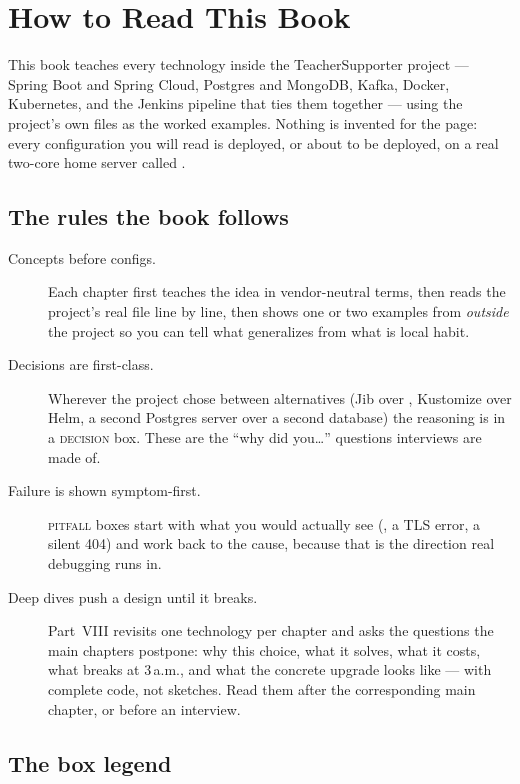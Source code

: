 \chapter{How to Read This Book}

This book teaches every technology inside the TeacherSupporter project ---
Spring Boot and Spring Cloud, Postgres and MongoDB, Kafka, Docker,
Kubernetes, and the Jenkins pipeline that ties them together --- using the
project's own files as the worked examples. Nothing is invented for the
page: every configuration you will read is deployed, or about to be
deployed, on a real two-core home server called .

\section*{The rules the book follows}

\begin{description}
  \item[Concepts before configs.] Each chapter first teaches the idea in
  vendor-neutral terms, then reads the project's real file line by line,
  then shows one or two examples from \emph{outside} the project so you can
  tell what generalizes from what is local habit.
  \item[Decisions are first-class.] Wherever the project chose between
  alternatives (Jib over , Kustomize over Helm, a second
  Postgres server over a second database) the reasoning is in a
  \textsc{decision} box. These are the ``why did you\ldots'' questions
  interviews are made of.
  \item[Failure is shown symptom-first.] \textsc{pitfall} boxes start with
  what you would actually see (, a TLS error, a
  silent 404) and work back to the cause, because that is the direction
  real debugging runs in.
  \item[Deep dives push a design until it breaks.] Part~VIII revisits
  one technology per chapter and asks the questions the main chapters
  postpone: why this choice, what it solves, what it costs, what breaks
  at 3\,a.m., and what the concrete upgrade looks like --- with complete
  code, not sketches. Read them after the corresponding main chapter, or
  before an interview.
\end{description}

\section*{The box legend}

